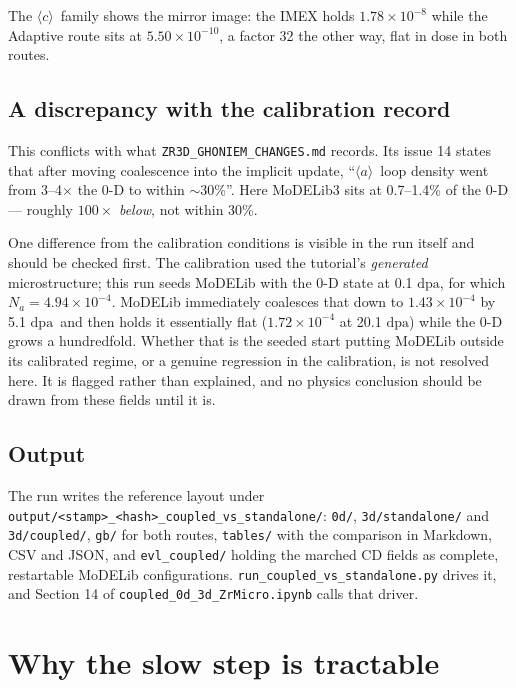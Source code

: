 \documentclass[11pt,a4paper]{article}
\newcommand{\code}[1]{\texttt{\small #1}}
\newcommand{\dpa}{\ensuremath{\mathrm{dpa}}}
\newcommand{\aloop}{\ensuremath{\langle a\rangle}}
\newcommand{\cloop}{\ensuremath{\langle c\rangle}}
\begin{document}
The \cloop\ family shows the mirror image: the IMEX holds
$1.78\times10^{-8}$ while the Adaptive route sits at $5.50\times10^{-10}$, a
factor 32 the other way, flat in dose in both routes.

\subsection{A discrepancy with the calibration record}

This conflicts with what \code{ZR3D\_GHONIEM\_CHANGES.md} records. Its issue 14
states that after moving coalescence into the implicit update, ``\aloop\ loop
density went from 3--4$\times$ the 0-D to within ${\sim}30\%$''. Here MoDELib3
sits at 0.7--1.4\% of the 0-D --- roughly $100\times$ \emph{below}, not within
30\%.

One difference from the calibration conditions is visible in the run itself and
should be checked first. The calibration used the tutorial's \emph{generated}
microstructure; this run seeds MoDELib with the 0-D state at 0.1 \dpa, for which
$N_a = 4.94\times10^{-4}$. MoDELib immediately coalesces that down to
$1.43\times10^{-4}$ by 5.1 \dpa\ and then holds it essentially flat
($1.72\times10^{-4}$ at 20.1 \dpa) while the 0-D grows a hundredfold. Whether
that is the seeded start putting MoDELib outside its calibrated regime, or a
genuine regression in the calibration, is not resolved here. It is flagged
rather than explained, and no physics conclusion should be drawn from these
fields until it is.

\subsection{Output}

The run writes the reference layout under
\code{output/<stamp>\_<hash>\_coupled\_vs\_standalone/}: \code{0d/},
\code{3d/standalone/} and \code{3d/coupled/}, \code{gb/} for both routes,
\code{tables/} with the comparison in Markdown, CSV and JSON, and
\code{evl\_coupled/} holding the marched CD fields as complete, restartable
MoDELib configurations. \code{run\_coupled\_vs\_standalone.py} drives it, and
Section 14 of \code{coupled\_0d\_3d\_ZrMicro.ipynb} calls that driver.

\section{Why the slow step is tractable}
\label{sec:tractability}
\end{document}
